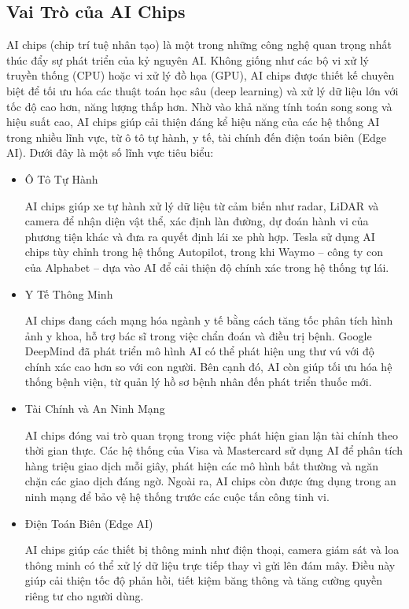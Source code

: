 \documentclass[a4paper]{article}
\begin{document}
\subsection{Vai Trò của AI Chips}
AI chips (chip trí tuệ nhân tạo) là một trong những công nghệ quan trọng nhất thúc đẩy sự phát triển của kỷ nguyên AI. Không giống như các bộ vi xử lý truyền thống (CPU) hoặc vi xử lý đồ họa (GPU), AI chips được thiết kế chuyên biệt để tối ưu hóa các thuật toán học sâu (deep learning) và xử lý dữ liệu lớn với tốc độ cao hơn, năng lượng thấp hơn.
Nhờ vào khả năng tính toán song song và hiệu suất cao, AI chips giúp cải thiện đáng kể hiệu năng của các hệ thống AI trong nhiều lĩnh vực, từ ô tô tự hành, y tế, tài chính đến điện toán biên (Edge AI). Dưới đây là một số lĩnh vực tiêu biểu:
\begin{itemize}
    \item Ô Tô Tự Hành\par
    AI chips giúp xe tự hành xử lý dữ liệu từ cảm biến như radar, LiDAR và camera để nhận diện vật thể, xác định làn đường, dự đoán hành vi của phương tiện khác và đưa ra quyết định lái xe phù hợp. Tesla sử dụng AI chips tùy chỉnh trong hệ thống Autopilot, trong khi Waymo – công ty con của Alphabet – dựa vào AI để cải thiện độ chính xác trong hệ thống tự lái.
    \item Y Tế Thông Minh\par
    AI chips đang cách mạng hóa ngành y tế bằng cách tăng tốc phân tích hình ảnh y khoa, hỗ trợ bác sĩ trong việc chẩn đoán và điều trị bệnh. Google DeepMind đã phát triển mô hình AI có thể phát hiện ung thư vú với độ chính xác cao hơn so với con người. Bên cạnh đó, AI còn giúp tối ưu hóa hệ thống bệnh viện, từ quản lý hồ sơ bệnh nhân đến phát triển thuốc mới.
    \item Tài Chính và An Ninh Mạng\par
    AI chips đóng vai trò quan trọng trong việc phát hiện gian lận tài chính theo thời gian thực. Các hệ thống của Visa và Mastercard sử dụng AI để phân tích hàng triệu giao dịch mỗi giây, phát hiện các mô hình bất thường và ngăn chặn các giao dịch đáng ngờ. Ngoài ra, AI chips còn được ứng dụng trong an ninh mạng để bảo vệ hệ thống trước các cuộc tấn công tinh vi.
    \item Điện Toán Biên (Edge AI)\par
    AI chips giúp các thiết bị thông minh như điện thoại, camera giám sát và loa thông minh có thể xử lý dữ liệu trực tiếp thay vì gửi lên đám mây. Điều này giúp cải thiện tốc độ phản hồi, tiết kiệm băng thông và tăng cường quyền riêng tư cho người dùng.
\end{itemize}
\end{document}
